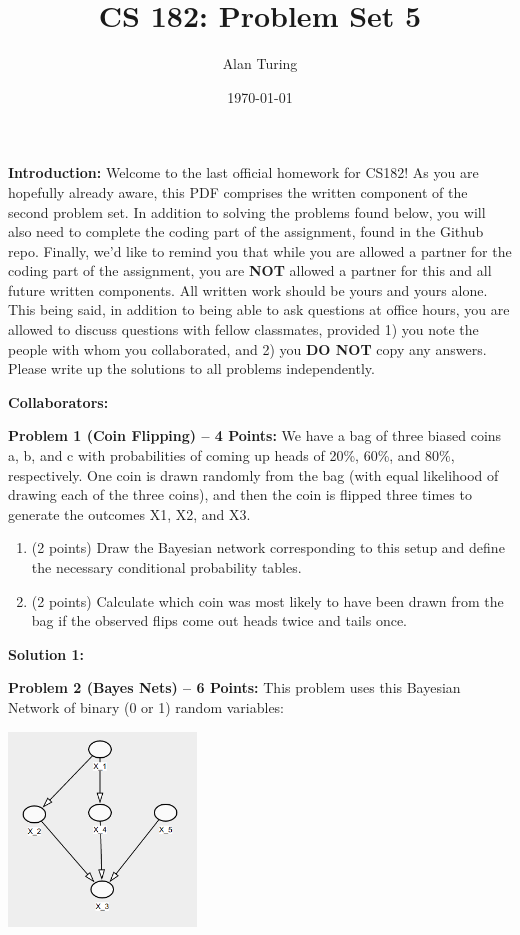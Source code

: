 \documentclass[]{article}
\title{CS 182: Problem Set 5}
\author{Alan Turing}
\date{\today}
\begin{document}
\maketitle

\textbf{Introduction:}  
Welcome to the last official homework for CS182!  As you are hopefully already aware, this PDF comprises the written component of the second problem set.  In addition to solving the problems found below, you will also need to complete the coding part of the assignment, found in the Github repo.  Finally, we'd like to remind you that while you are allowed a partner for the coding part of the assignment, you are \textbf{NOT} allowed a partner for this and all future written components.  All written work should be yours and yours alone.  This being said, in addition to being able to ask questions at office hours, you are allowed to discuss questions with fellow classmates, provided 1) you note the people with whom you collaborated, and 2) you \textbf{DO NOT} copy any answers.  Please write up the solutions to all problems independently.

\bigskip
\textbf{Collaborators:}

\clearpage

\textbf{Problem 1 (Coin Flipping) -- 4 Points:}
We have a bag of three biased coins a, b, and c with probabilities of coming up heads of 20\%, 60\%, and 80\%, respectively. One coin is drawn randomly from the bag (with equal likelihood of drawing each of the three coins), and then the coin is flipped three times to generate the outcomes X1, X2, and X3.

\begin{enumerate}[label=(\alph*)]
    \item (2 points) Draw the Bayesian network corresponding to this setup and define the necessary conditional probability tables.
    \item (2 points) Calculate which coin was most likely to have been drawn from the bag if the observed flips come out heads twice and tails once.
\end{enumerate}
\bigskip

\textbf{Solution 1:}

\clearpage

\textbf{Problem 2 (Bayes Nets) -- 6 Points:}
This problem uses this Bayesian Network of binary (0 or 1) random variables:
\begin{center}
    \includegraphics[width=5cm]{BN.png}
\end{center}
\end{document}
